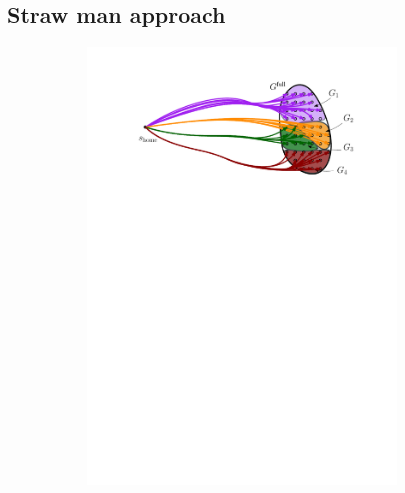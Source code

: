 \documentclass[conference]{IEEEtran}
\begin{document}
\subsection{Straw man approach}
\begin{figure}[t]
    \centering
    \begin{subfigure}{.225\textwidth}
        \includegraphics[width=0.9\textwidth]{naive1}
        \caption{}
        \label{fig:naive1}
    \end{subfigure}
    \hfill
    \begin{subfigure}{0.225\textwidth}

\end{subfigure}
\end{figure}
\end{document}
